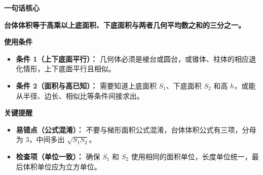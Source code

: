 \begin{summarybox}

	\textbf{\textcolor{CSummary}{一句话核心}}

	\textbf{台体体积等于高乘以上底面积、下底面积与两者几何平均数之和的三分之一。}

	\medskip

	\textbf{\textcolor{CSummary}{使用条件}}

	\begin{itemize}[leftmargin=*, itemsep=0.5em, topsep=0.4em]
		\item \textbf{条件 1（上下底面平行）：} 几何体必须是棱台或圆台，或锥体、柱体的相应退化情形，上下底面平行且相似。
		\item \textbf{条件 2（面积与高已知）：} 需要知道上底面积 $S_1$、下底面积 $S_2$ 和高 $h$，或能从半径、边长、相似比等条件间接求出。
	\end{itemize}

	\medskip

	\textbf{\textcolor{CSummary}{关键提醒}}

	\begin{itemize}[leftmargin=*, itemsep=0.5em, topsep=0.4em]
		\item \textbf{易错点（公式混淆）：} 不要与梯形面积公式混淆，台体体积公式有三项，分母为 $3$，中间多出 $\sqrt{S_1S_2}$。
		\item \textbf{检查项（单位一致）：} 确保 $S_1$ 和 $S_2$ 使用相同的面积单位，长度单位统一，最后体积单位应为立方单位。
	\end{itemize}

\end{summarybox}